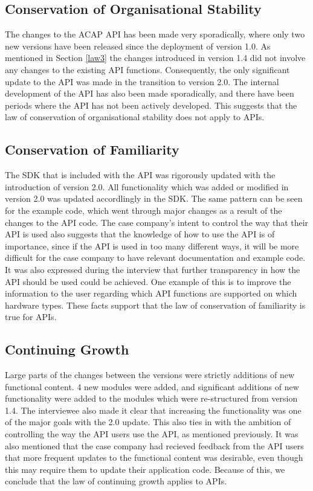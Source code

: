 \documentclass{sig-alternate}
\begin{document}
\subsection{Conservation of Organisational Stability}
The changes to the ACAP API has been made very sporadically, where only two new versions have been released since the deployment of version 1.0. As mentioned in Section \ref{law3} the changes introduced in version 1.4 did not involve any changes to the existing API functions. Consequently, the only significant update to the API was made in the transition to version 2.0. The internal development of the API has also been made sporadically, and there have been periods where the API has not been actively developed. This suggests that the law of conservation of organisational stability does not apply to APIs. 


\subsection{Conservation of Familiarity}
The SDK that is included with the API was rigorously updated with the introduction of version 2.0. All functionality which was added or modified in version 2.0 was updated accordlingly in the SDK. The same pattern can be seen for the example code, which went through major changes as a result of the changes to the API code. The case company's intent to control the way that their API is used also suggests that the knowledge of how to use the API is of importance, since if the API is used in too many different ways, it will be more difficult for the case company to have relevant documentation and example code. It was also expressed during the interview that further transparency in how the API should be used could be achieved. One example of this is to improve the information to the user regarding which API functions are supported on which hardware types. These facts support that the law of conservation of familiarity is true for APIs. 

\subsection{Continuing Growth}
Large parts of the changes between the versions were strictly additions of new functional content. 4 new modules were added, and significant additions of new functionality were added to the modules which were re-structured from version 1.4. The interviewee also made it clear that increasing the functionality was one of the major goals with the 2.0 update. This also ties in with the ambition of controlling the way the API users use the API, as mentioned previously. It was also mentioned that the case company had recieved feedback from the API users that more frequent updates to the functional content was desirable, even though this may require them to update their application code. Because of this, we conclude that the law of continuing growth applies to APIs. 
\end{document}
